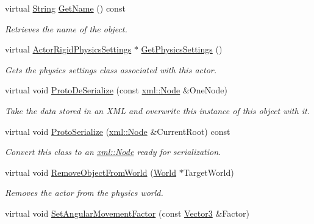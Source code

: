 \begin{DoxyCompactItemize}
virtual \hyperlink{namespacephys_aa03900411993de7fbfec4789bc1d392e}{String} \hyperlink{classphys_1_1ActorRigid_a63952e0b7ab7176ae60d96756dd84b43}{GetName} () const 
\begin{DoxyCompactList}\small\item\em Retrieves the name of the object. \item\end{DoxyCompactList}\item 
virtual \hyperlink{classphys_1_1ActorRigidPhysicsSettings}{ActorRigidPhysicsSettings} $\ast$ \hyperlink{classphys_1_1ActorRigid_ac531871f990894cf64d0ece918eb18d0}{GetPhysicsSettings} ()
\begin{DoxyCompactList}\small\item\em Gets the physics settings class associated with this actor. \item\end{DoxyCompactList}\item 
virtual void \hyperlink{classphys_1_1ActorRigid_abf14ffa79e652f0d798a2fce99496259}{ProtoDeSerialize} (const \hyperlink{classphys_1_1xml_1_1Node}{xml::Node} \&OneNode)
\begin{DoxyCompactList}\small\item\em Take the data stored in an XML and overwrite this instance of this object with it. \item\end{DoxyCompactList}\item 
virtual void \hyperlink{classphys_1_1ActorRigid_add4e731eb3a5481d05e2d0f543745fcd}{ProtoSerialize} (\hyperlink{classphys_1_1xml_1_1Node}{xml::Node} \&CurrentRoot) const 
\begin{DoxyCompactList}\small\item\em Convert this class to an \hyperlink{classphys_1_1xml_1_1Node}{xml::Node} ready for serialization. \item\end{DoxyCompactList}\item 
virtual void \hyperlink{classphys_1_1ActorRigid_a7101df2a149e0ccb3678b7c2c00998f8}{RemoveObjectFromWorld} (\hyperlink{classphys_1_1World}{World} $\ast$TargetWorld)
\begin{DoxyCompactList}\small\item\em Removes the actor from the physics world. \item\end{DoxyCompactList}\item 
virtual void \hyperlink{classphys_1_1ActorRigid_a574fc272f603b879643872dbced36cc2}{SetAngularMovementFactor} (const \hyperlink{classphys_1_1Vector3}{Vector3} \&Factor)

\end{DoxyCompactItemize}
